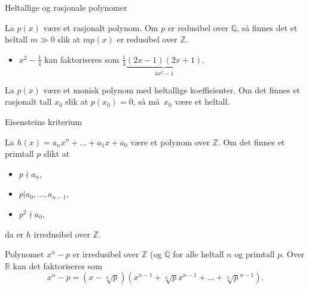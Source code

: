 \documentclass[norsk, handout]{beamer}
\theoremstyle{example}
\begin{document}
\begin{frame}{Heltallige og rasjonale polynomer}
    \begin{lemma}
        La $p(x)$ være et rasjonalt polynom.
        Om $p$ er redusibel over $\mathbb Q$,
        så finnes det et heltall $m \gg 0$ slik at
        $mp(x)$ er redusibel over $\mathbb Z$.
    \end{lemma}
    \begin{example}
        \begin{itemize}
            \item $x^2 - \frac 1 4$
                kan faktoriseres som $\frac 1 4 \underbrace{(2x - 1)(2x + 1)}_{4x^2 - 1}$.
        \end{itemize}
    \end{example}
    \pause
    \begin{theorem}
        La $p(x)$ være et monisk polynom med heltallige koeffisienter.
        Om det finnes et rasjonalt tall $x_0$ slik at
        $p(x_0) = 0$, så må $x_0$ være et heltall.
    \end{theorem}
\end{frame}

\begin{frame}{Eisensteins kriterium}
    \begin{theorem}
        La $h(x) = a_n x^n + \dots + a_1 x + a_0$ være et polynom over $\mathbb Z$.
        Om det finnes et primtall $p$
        slikt at
        \begin{itemize}
            \item $p\nmid a_n$,
            \item $p | a_0,\dots, a_{n -  1}$,
            \item $p^2 \nmid a_0$,
        \end{itemize}
        da er $h$ irredusibel over $\mathbb Z$.
    \end{theorem}
    \begin{example}
        Polynomet $x^n - p$ er irredusibel over $\mathbb Z$ (og $\mathbb Q$ for alle heltall $n$ og primtall $p$.
        Over $\mathbb R$ kan det faktoriseres som
        \[
            x^n - p = (x - \sqrt[n] p) (x^{n - 1} + \sqrt[n] p x^{n - 1} + \dots + \sqrt [n] p^{n - 1}).
        \]
    \end{example}
\end{frame}
\end{document}
